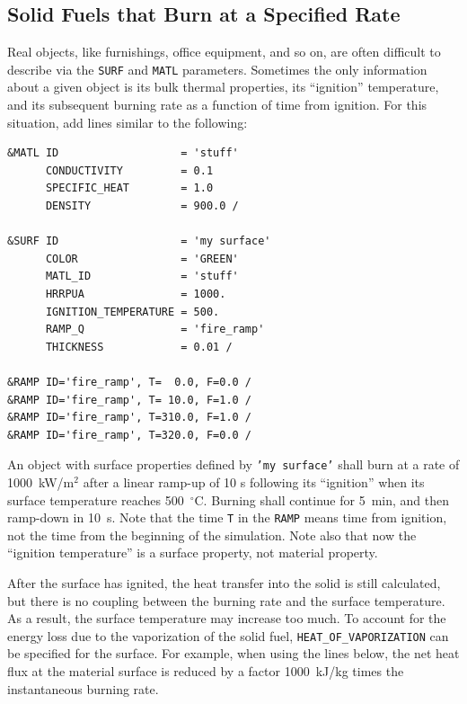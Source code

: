 \documentclass[11pt]{book}
\newcommand{\ct}{\tt\small}
\begin{document}
\subsection{Solid Fuels that Burn at a Specified Rate}

\label{info:specified_burning}

Real objects, like furnishings, office equipment, and so on, are
often difficult to describe via the {\ct SURF} and {\ct MATL}
parameters. Sometimes the only information about a given object is its
bulk thermal properties, its ``ignition'' temperature, and its
subsequent burning rate as a function of time from ignition. For
this situation, add lines similar to the following:

\footnotesize
\begin{verbatim}
&MATL ID                   = 'stuff'
      CONDUCTIVITY         = 0.1
      SPECIFIC_HEAT        = 1.0
      DENSITY              = 900.0 /

&SURF ID                   = 'my surface'
      COLOR                = 'GREEN'
      MATL_ID              = 'stuff'
      HRRPUA               = 1000.
      IGNITION_TEMPERATURE = 500.
      RAMP_Q               = 'fire_ramp'
      THICKNESS            = 0.01 /

&RAMP ID='fire_ramp', T=  0.0, F=0.0 /
&RAMP ID='fire_ramp', T= 10.0, F=1.0 /
&RAMP ID='fire_ramp', T=310.0, F=1.0 /
&RAMP ID='fire_ramp', T=320.0, F=0.0 /
\end{verbatim} \normalsize

\noindent
An object with surface properties defined by {\ct 'my surface'} shall
burn at a rate of 1000~kW/m$^2$ after a linear ramp-up of 10 s
following its ``ignition'' when its surface temperature reaches
500~$^\circ$C. Burning shall continue for 5~min, and then ramp-down
in 10~s. Note that the time {\ct T} in the {\ct RAMP} means time from
ignition, not the time from the beginning of the simulation. Note also that now the ``ignition temperature'' is a surface
property, not material property.

After the surface has ignited, the heat transfer into the solid is
still calculated, but there is no coupling between the burning rate
and the surface temperature. As a result, the surface temperature may
increase too much. To account for the energy loss due to the
vaporization of the solid fuel, {\ct HEAT\_OF\_VAPORIZATION} can be
specified for the surface. For example, when using the lines below,
the net heat flux at the material surface is reduced by a factor
1000~kJ/kg times the instantaneous burning rate.
\end{document}
